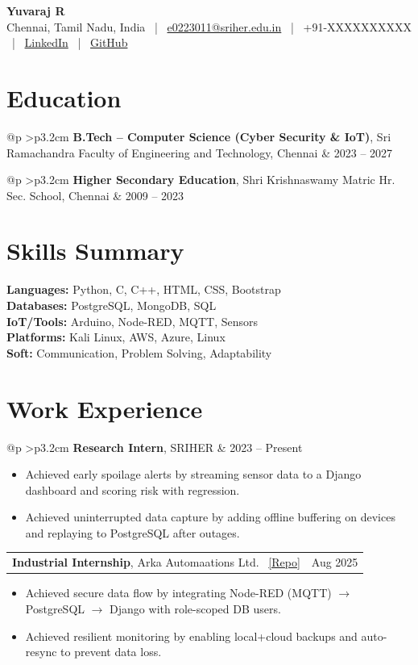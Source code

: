 \documentclass[10pt, letterpaper]{article}
\makeatletter
\newenvironment{highlights}{\begin{itemize}[topsep=2pt,parsep=0pt,partopsep=0pt,itemsep=2pt,leftmargin=12pt]\small}{\end{itemize}}
\newcommand{\entryrow}[2]{%
  \noindent\begin{tabular*}{\linewidth}{@{\extracolsep{\fill}}p{\linewidth-3.2cm} >{\raggedleft\arraybackslash}p{3.2cm}}
  #1 & {\small #2} \\
  \end{tabular*}\vspace{2pt}
}
\newcommand{\Header}{
  {\fontsize{18pt}{18pt}\selectfont \textbf{Yuvaraj R}}\\[3pt]
  \small
  Chennai, Tamil Nadu, India \, | \,
  \href{mailto:e0223011@sriher.edu.in}{e0223011@sriher.edu.in} \, | \,
  +91-XXXXXXXXXX \, | \,
  \href{https://linkedin.com/in/yuvaraj-ramu-89b80b285}{LinkedIn} \, | \,
  \href{https://github.com/yuvaraj2626}{GitHub}
}
\newcommand{\Repo}[1]{\textcolor{blue}{\href{#1}{[Repo]}}}
\makeatother
\begin{document}
\Header

\vspace{4pt}

\section{Education}
\entryrow{\textbf{B.Tech – Computer Science (Cyber Security \& IoT)}, Sri Ramachandra Faculty of Engineering and Technology, Chennai}{2023 -- 2027}
\entryrow{\textbf{Higher Secondary Education}, Shri Krishnaswamy Matric Hr. Sec. School, Chennai}{2009 -- 2023}

\section{Skills Summary}
\small
\textbf{Languages:} Python, C, C++, HTML, CSS, Bootstrap \\
\textbf{Databases:} PostgreSQL, MongoDB, SQL \\
\textbf{IoT/Tools:} Arduino, Node-RED, MQTT, Sensors \\
\textbf{Platforms:} Kali Linux, AWS, Azure, Linux \\
\textbf{Soft:} Communication, Problem Solving, Adaptability

\section{Work Experience}
\entryrow{\textbf{Research Intern}, SRIHER}{2023 -- Present}
\begin{highlights}
  \item Achieved early spoilage alerts by streaming sensor data to a Django dashboard and scoring risk with regression.
  \item Achieved uninterrupted data capture by adding offline buffering on devices and replaying to PostgreSQL after outages.
\end{highlights}

\entryrow{\textbf{Industrial Internship}, Arka Automaations Ltd. \, \footnotesize\Repo{https://github.com/yuvaraj2626/Industrial-Internship-Arka-Automaations-}}{Aug 2025}
\begin{highlights}
  \item Achieved secure data flow by integrating Node-RED (MQTT) $\rightarrow$ PostgreSQL $\rightarrow$ Django with role-scoped DB users.
  \item Achieved resilient monitoring by enabling local+cloud backups and auto-resync to prevent data loss.
\end{highlights}
\end{document}

